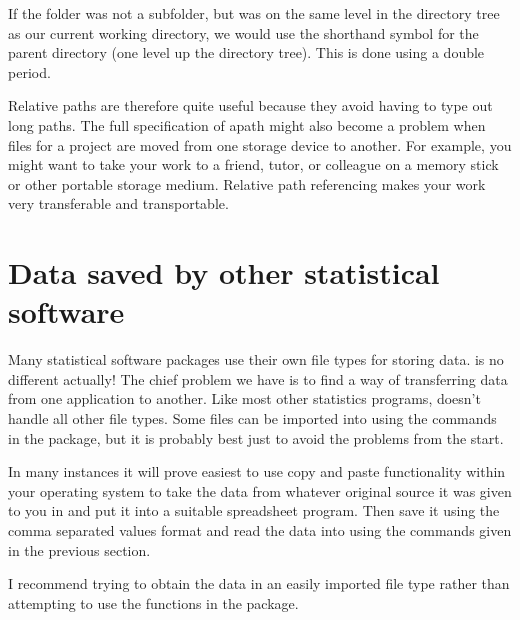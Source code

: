 If the  folder was not a subfolder, but was on the same level in the directory tree as our current working directory, we would use the shorthand symbol for the parent directory (one level up the directory tree). This is done using  a double period. 
\begin{knitrout}
\color{fgcolor}\begin{kframe}
\begin{alltt}
 \hlkwb{=} \hlstd{(}\hlstd{)}
\end{alltt}
\end{kframe}
\end{knitrout}
 
Relative paths are therefore quite useful because they avoid having to type out long paths. The full specification of apath might also become a problem when files for a project are moved from one storage device to another. For example, you might want to take your work to a friend, tutor, or colleague on a  memory stick or other portable storage medium. Relative path referencing makes your work very transferable and transportable. 
 
 
 
 
 
 
\section{Data saved by other statistical software} 
 
Many statistical software packages use their own file types for storing data. \R{} is no different actually! The chief problem we have is to find a way of transferring data from one application to another. Like most other statistics programs, \R{} doesn't handle all other file types. Some files can be imported into \R{} using the commands in the  package, but it is probably best just to avoid the problems from the start. 
 
In many instances it will prove easiest to use copy and paste functionality within your operating system to take the data from whatever original source it was given to you in and put it into a suitable spreadsheet program. Then save it using the comma separated values format and read the data into \R{} using the commands given in the previous section. 
 
I recommend trying to obtain the data in an easily imported file type rather than attempting to use the functions in the  package. 
 
